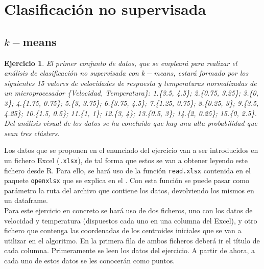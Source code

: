 \documentclass[12pt]{report}\usepackage[]{graphicx}\usepackage[dvipsnames]{xcolor}
\newtheorem{exercise}{Ejercicio}[section]
\begin{document}
		 \section{Clasificación no supervisada}
		 
		 	\subsection{$k-$means}
		 
				 \begin{exercise}\label{ex:kmeans}
					 	El primer conjunto de datos, que se empleará para realizar el análisis de clasificación no supervisada con $k-$means, estará formado por los siguientes 15 valores de velocidades de respuesta y temperaturas normalizadas de un microprocesador \{Velocidad, Temperatura\}: 1.\{3.5, 4.5\}; 2.\{0.75, 3.25\}; 3.\{0, 3\}; 4.\{1.75, 0.75\}; 5.\{3, 3.75\}; 6.\{3.75, 4.5\}; 7.\{1.25, 0.75\}; 8.\{0.25, 3\}; 9.\{3.5, 4.25\}; 10.\{1.5, 0.5\}; 11.\{1, 1\}; 12.\{3, 4\}; 13.\{0.5, 3\}; 14.\{2, 0.25\}; 15.\{0, 2.5\}. Del análisis visual de los datos se ha concluido que hay una alta probabilidad que sean tres clústers.
				 \end{exercise}
				 
				 Los datos que se proponen en el enunciado del ejercicio van a ser introducidos en un fichero Excel (\texttt{.xlsx}), de tal forma que estos se van a obtener leyendo este fichero desde R. Para ello, se hará uso de la función \texttt{read.xlsx} contenida en el paquete \texttt{openxlsx} que se explica en el . Con esta función se puede pasar como parámetro la ruta del archivo que contiene los datos, devolviendo los mismos en un dataframe.\\
				 
				 Para este ejercicio en concreto se hará uso de dos ficheros, uno con los datos de velocidad y temperatura (dispuestos cada uno en una columna del Excel), y otro fichero que contenga las coordenadas de los centroides iniciales que se van a utilizar en el algoritmo. En la primera fila de ambos ficheros deberá ir el título de cada columna. Primeramente se leen los datos del ejercicio. A partir de ahora, a cada uno de estos datos se les conocerán como puntos.
				 
\end{document}

